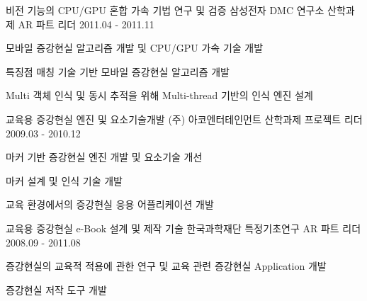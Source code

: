 \begin{cventries}
  \cventry
    {비전 기능의 CPU/GPU 혼합 가속 기법  연구 및 검증} %
    {삼성전자 DMC 연구소 산학과제} %
    {AR 파트 리더} %
    {2011.04 - 2011.11} %
    {
      \begin{cvitems} %
        \item{모바일 증강현실 알고리즘 개발 및 CPU/GPU 가속 기술 개발}
        \item {특징점 매칭 기술 기반 모바일 증강현실 알고리즘 개발}
        \item {Multi 객체 인식 및 동시 추적을 위해 Multi-thread 기반의 인식 엔진 설계}
      \end{cvitems}
    }

  \cventry
    {교육용 증강현실 엔진 및 요소기술개발} %
    {(주) 아코엔터테인먼트 산학과제} %
    {프로젝트 리더} %
    {2009.03 - 2010.12} %
    {
      \begin{cvitems} %
        \item {마커 기반 증강현실 엔진 개발 및 요소기술 개선}
        \item {마커 설계 및 인식 기술 개발}
        \item {교육 환경에서의 증강현실 응용 어플리케이션 개발}
      \end{cvitems}
    }

  \cventry
    {교육용 증강현실 e-Book 설계 및 제작 기술} %
    {한국과학재단 특정기초연구} %
    {AR 파트 리더} %
    {2008.09 - 2011.08} %
    {
      \begin{cvitems} %
        \item {증강현실의 교육적 적용에 관한 연구 및 교육 관련 증강현실 Application 개발}
        \item {증강현실 저작 도구 개발}
      \end{cvitems}
    }


\end{cventries}
